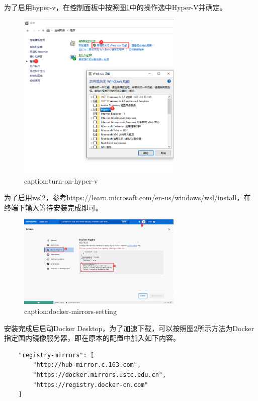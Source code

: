 为了启用hyper-v，在控制面板中按照图\ref{fig:turn-on-hyper-v}中的操作选中Hyper-V并确定。
\begin{figure}[htbp]
	\centering
	\includegraphics[width=0.7\textwidth]{figures/turn-on-hyper-v.png}
	\caption{caption:turn-on-hyper-v}
	\label{fig:turn-on-hyper-v}
\end{figure}

为了启用wsl2，参考\url{https://learn.microsoft.com/en-us/windows/wsl/install}，在终端下输入等待安装完成即可。

\begin{figure}[htbp]
	\centering
	\includegraphics[width=0.7\textwidth]{figures/docker-mirrors-setting.png}
	\caption{caption:docker-mirrors-setting}
	\label{fig:docker-mirrors-setting}
\end{figure}

安装完成后启动Docker Desktop，为了加速下载，可以按照图\ref{fig:docker-mirrors-setting}所示方法为Docker指定国内镜像服务器，即在原本的配置中加入如下内容。
\begin{lstlisting}
    "registry-mirrors": [
        "http://hub-mirror.c.163.com",
        "https://docker.mirrors.ustc.edu.cn",
        "https://registry.docker-cn.com"
    ]
\end{lstlisting}

